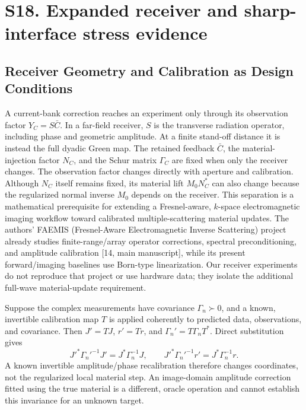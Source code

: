 \clearpage
\section*{S18. Expanded receiver and sharp-interface stress evidence}
\subsection*{Receiver Geometry and Calibration as Design Conditions}

A current-bank correction reaches an experiment only through its observation factor \(Y_C=S\bar C\). In a far-field receiver, \(S\) is the transverse radiation operator, including phase and geometric amplitude. At a finite stand-off distance it is instead the full dyadic Green map. The retained feedback \(\bar C\), the material-injection factor \(N_C\), and the Schur matrix \(\Gamma_C\) are fixed when only the receiver changes. The observation factor changes directly with aperture and calibration. Although \(N_C\) itself remains fixed, its material lift \(M_0N_C^*\) can also change because the regularized normal inverse \(M_0\) depends on the receiver. This separation is a mathematical prerequisite for extending a Fresnel-aware, \(k\)-space electromagnetic imaging workflow toward calibrated multiple-scattering material updates. The authors' FAEMIS (Fresnel-Aware Electromagnetic Inverse Scattering) project already studies finite-range/array operator corrections, spectral preconditioning, and amplitude calibration [14, main manuscript], while its present forward/imaging baselines use Born-type linearization. Our receiver experiments do not reproduce that project or use hardware data; they isolate the additional full-wave material-update requirement.

Suppose the complex measurements have covariance \(\Gamma_n\succ0\), and a known, invertible calibration map \(T\) is applied coherently to predicted data, observations, and covariance. Then \(J'=TJ\), \(r'=Tr\), and \(\Gamma_n'=T\Gamma_nT^*\). Direct substitution gives
\begin{equation}
J'^*\Gamma_n'^{-1}J'=J^*\Gamma_n^{-1}J,\qquad
J'^*\Gamma_n'^{-1}r'=J^*\Gamma_n^{-1}r.
\tag{S15}\label{eq:calibration-invariance}
\end{equation}
A known invertible amplitude/phase recalibration therefore changes coordinates, not the regularized local material step. An image-domain amplitude correction fitted using the true material is a different, oracle operation and cannot establish this invariance for an unknown target.

